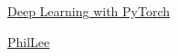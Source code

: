 \documentclass[11pt]{article}
\begin{document}
	\kaishu 
	\setcounter{section}{0}
	\begin{center}
		{\LARGE  \href{https://space.bilibili.com/1274695134/lists/2083514?type=season}{Deep Learning with PyTorch}}
		
		
		{\large \href{https://space.bilibili.com/1274695134}{PhilLee}}
	\end{center}
\setcounter{page}{1}



\vspace{-1cm}
\end{document}
